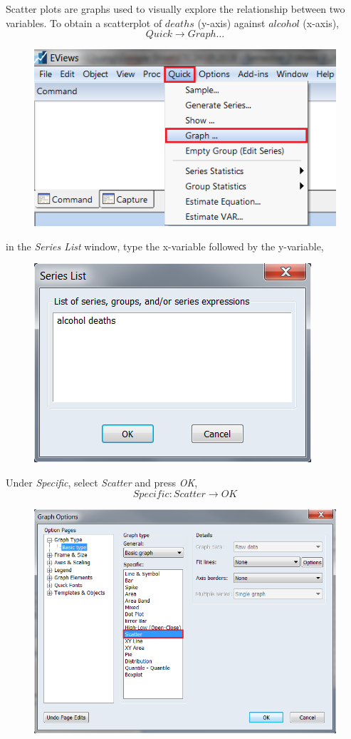 \documentclass[12pt]{report}
\begin{document}
		\noindent Scatter plots are graphs used to visually explore the relationship between two variables. To obtain a scatterplot of $deaths$ (y-axis) against $alcohol$ (x-axis),
		$$Quick \to Graph \dots$$
		\begin{figure}[H]
			\centerline{\includegraphics{q3_1}}
		\end{figure}
		\vspace{-\baselineskip}
		\noindent in the \textit{Series List} window, type the x-variable followed by the y-variable,
		\begin{figure}[H]
			\centerline{\includegraphics{q3_2}}
		\end{figure}
		\vspace{-\baselineskip}	
		\noindent Under \textit{Specific}, select \textit{Scatter} and press \textit{OK},
		$$Specific:Scatter \to OK$$
		\begin{figure}[H]
			\centerline{\includegraphics{scat3}}
		\end{figure}
\end{document}
